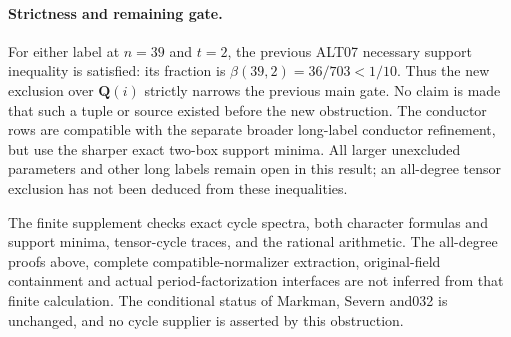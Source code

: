 \paragraph{Strictness and remaining gate.}
For either label at $n=39$ and $t=2$, the previous ALT07
necessary support inequality is satisfied: its fraction is
$\beta(39,2)=36/703<1/10$. Thus the new exclusion over
$\mathbf Q(i)$ strictly narrows the previous main gate.
No claim is made that such a tuple or source existed before
the new obstruction. The conductor rows are compatible with
the separate broader long-label conductor refinement, but
use the sharper exact two-box support minima. All larger
unexcluded parameters and other long labels remain open in
this result; an all-degree tensor exclusion has not been
deduced from these inequalities.

The finite supplement checks exact cycle spectra, both
character formulas and support minima, tensor-cycle traces,
and the rational arithmetic. The all-degree proofs above,
complete compatible-normalizer extraction, original-field
containment and actual period-factorization interfaces are
not inferred from that finite calculation. The conditional
status of Markman, Severn and032 is unchanged, and no cycle
supplier is asserted by this obstruction.
